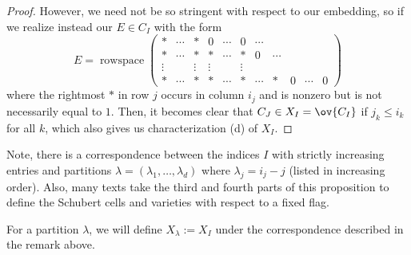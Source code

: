 \documentclass[11pt,leqno,oneside]{amsbook}
\numberwithin{thm}{section}
\begin{document}
\begin{proof}
However, we need not be so stringent with respect to our embedding, so
if we realize instead our \(E \in C_I\) with the form \[ 
  E = \operatorname{rowspace} \left(
    \begin{array}{ccccccccccc}
      *&\cdots&*&0&\cdots&0&\cdots&&&&\\
      *&\cdots&*&*&\cdots&*&0&\cdots&&&\\
      \vdots&&\vdots&\vdots&&\vdots&&&&&\\
      *&\cdots&*&*&\cdots&*&\cdots&*&0&\cdots&0
    \end{array}
\right)
\]
where the rightmost \(*\) in row \(j\) occurs in column \(i_j\) and is
nonzero but is not necessarily equal to \(1\). Then, it becomes clear
that \(C_J \in X_I = \ov{C_I}\) if \(j_k \leq i_k\) for all \(k\),
which also gives us characterization (d) of \(X_I\).
\end{proof}
\begin{rmk}
  Note, there is a correspondence between the indices \(I\) with
  strictly increasing entries and partitions \(\lambda = (\lambda_1,
  \ldots, 
  \lambda_d)\) where \(\lambda_j = i_j - j\) (listed in increasing
  order). Also, many texts take 
  the third and fourth parts of this proposition to define the
  Schubert cells and varieties with respect to a fixed flag. 
\end{rmk}
\begin{defn}
  For a partition \(\lambda\), we will define \(X_\lambda := X_I\)
  under the correspondence described in the remark above. 
\end{defn}
\begin{bibdiv}
  \begin{biblist}
  \end{biblist}
\end{bibdiv}
\end{document}
